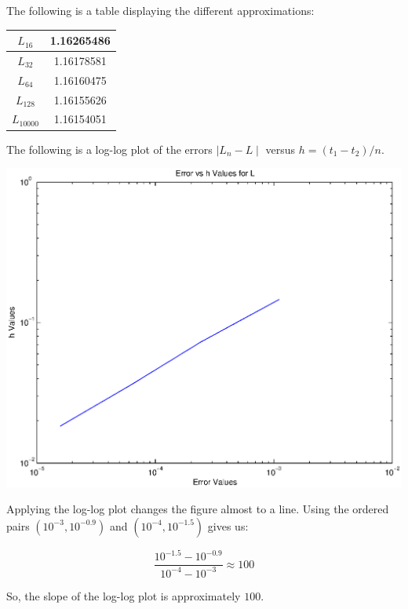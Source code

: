 \documentclass[paper=a4, fontsize=11pt]{scrartcl} %
\numberwithin{equation}{section} %
\numberwithin{figure}{section} %
\numberwithin{table}{section} %
\begin{document}
\begin{flushleft}
The following is a table displaying the different approximations:
\end{flushleft}

\begin{center}
  \begin{tabular}{ | c | c | }
    \hline
    $L_{16}    $ & 1.16265486  \\ \hline
    $L_{32}    $ & 1.16178581  \\ \hline
    $L_{64}    $ & 1.16160475  \\ \hline
    $L_{128}   $ & 1.16155626  \\ \hline
    $L_{10000} $ & 1.16154051  \\
    \hline
  \end{tabular}
\end{center}

The following is a log-log plot of the errors $\mid L_n - L \mid$ versus $h = (t_1 - t_2) / n$.  

\includegraphics [scale=0.8] {prob2fig.eps}

\begin{flushleft}
Applying the log-log plot changes the figure almost to a line.  Using the ordered pairs $(10^{-3}, 10^{-0.9})$ and $(10^{-4},10^{-1.5})$ gives us:
\end{flushleft}
$$\frac{10^{-1.5}-10^{-0.9}}{10^{-4}-10^{-3}} \approx 100$$

\begin{flushleft}
So, the slope of the log-log plot is approximately $100$.  
\end{flushleft}





\end{document}
